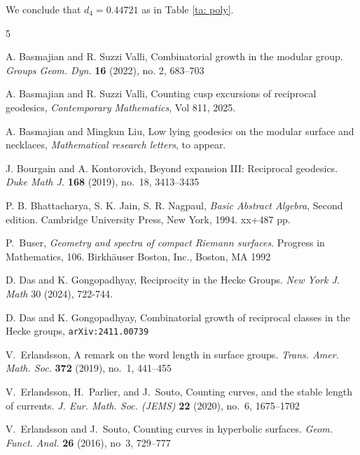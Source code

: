 \documentclass[11pt]{amsart}
\numberwithin{equation}{section}
\theoremstyle{plain}
\begin{document}
We conclude that  $d_{4}=0.44721$ as in 
Table \ref{ta: poly}.











 \begin{thebibliography}{5}

 A. Basmajian and R. Suzzi Valli, Combinatorial growth in the modular group. {\it Groups Geom. Dyn.} \textbf{16} (2022), no. 2, 683--703

 A. Basmajian and R. Suzzi Valli, Counting cusp excursions of reciprocal geodesics, {\it Contemporary Mathematics}, Vol 811, 2025.

  A.  Basmajian and Mingkun Liu, Low lying geodesics on the modular surface and necklaces, 
{\it Mathematical research letters}, to appear. 



 J. Bourgain and A. Kontorovich, Beyond
expansion III: Reciprocal geodesics. {\it Duke Math J.} \textbf{168} (2019), no.~18, 3413--3435

  P. B. Bhattacharya, S. K. Jain, S. R. Nagpaul, {\it Basic Abstract Algebra}, Second edition. Cambridge University Press, New York, 1994. xx+487 pp.

 P.~Buser, {\it Geometry and spectra of compact Riemann surfaces}. Progress in Mathematics, 106. Birkh\"{a}user Boston,  Inc., Boston, MA 1992

 D. Das and K. Gongopadhyay, Reciprocity in the Hecke Groups. {\it New York J. Math} 30 (2024), 722-744.

 D. Das and K. Gongopadhyay, Combinatorial growth of reciprocal classes in the Hecke groups, \texttt{arXiv:2411.00739}

 V.~Erlandsson, A remark on the word length in surface groups. {\it Trans. Amer. Math. Soc.} \textbf{372} (2019), no.~1, 441--455

 V.~Erlandsson, H.~Parlier, and J.~Souto, Counting curves, and the stable length of currents. {\it J. Eur. Math. Soc. (JEMS)} \textbf{22} (2020), no.~6, 1675--1702

 V.~Erlandsson and J.~Souto, Counting curves in hyperbolic surfaces. {\it Geom. Funct. Anal.} \textbf{26} (2016), no~3, 729--777


\end{thebibliography}
\end{document}
